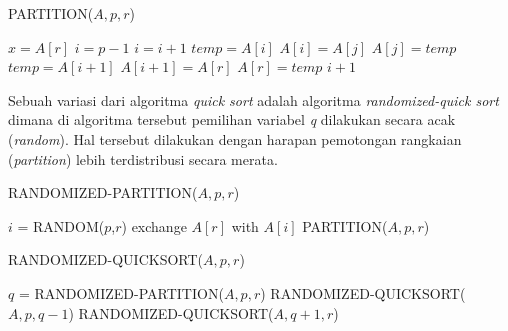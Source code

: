 \begin{algorithm}[H]
	\caption{PARTITION($A,p,r$)}
	\begin{algorithmic}[1]
		\STATE $x = A[r]$
		\STATE $i = p-1$
				\STATE $i = i + 1$
				\STATE $temp = A[i]$
				\STATE $A[i] = A[j]$
				\STATE $A[j] = temp$
			\ENDIF
		\ENDFOR
		\STATE $temp = A[i+1]$
		\STATE $A[i+1] = A[r]$
		\STATE $A[r] = temp$
		\RETURN $i+1$
	\end{algorithmic}
\end{algorithm}

Sebuah variasi dari algoritma \textit{quick sort} adalah algoritma \textit{randomized-quick sort} dimana di algoritma tersebut pemilihan variabel \textit{q} dilakukan secara acak (\textit{random}). Hal tersebut dilakukan dengan harapan pemotongan rangkaian (\textit{partition}) lebih terdistribusi secara merata.

\begin{algorithm}[H]
	\caption{RANDOMIZED-PARTITION($A,p,r$)}
	\begin{algorithmic}[1]
		\STATE $i$ = RANDOM($p$,$r$)
		\STATE exchange $A[r]$ with $A[i]$
		\RETURN PARTITION($A,p,r$)
	\end{algorithmic}
\end{algorithm}

\begin{algorithm}[H]
	\caption{RANDOMIZED-QUICKSORT($A,p,r$)}
	\begin{algorithmic}[1]
			\STATE $q$ = RANDOMIZED-PARTITION($A,p,r$)
			\STATE RANDOMIZED-QUICKSORT($A,p,q-1$)
			\STATE RANDOMIZED-QUICKSORT($A,q+1,r$)
		\ENDIF
	\end{algorithmic}
\end{algorithm}